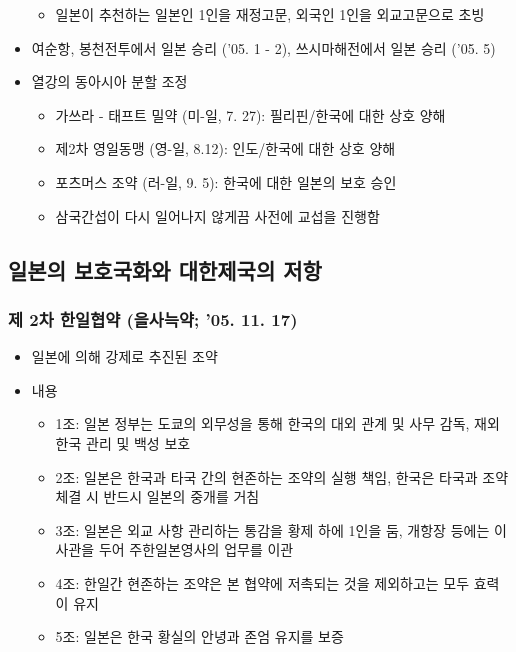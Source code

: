 \begin{itemize}
    \begin{itemize}
        \item 일본이 추천하는 일본인 1인을 재정고문, 외국인 1인을 외교고문으로 초빙
    \end{itemize}
    \item 여순항, 봉천전투에서 일본 승리 ('05. 1 - 2), 쓰시마해전에서 일본 승리 ('05. 5)
    \newpage
    \item 열강의 동아시아 분할 조정
    \begin{itemize}
        \item 가쓰라 - 태프트 밀약 (미-일, 7. 27): 필리핀/한국에 대한 상호 양해
        \item 제2차 영일동맹 (영-일, 8.12): 인도/한국에 대한 상호 양해
        \item 포츠머스 조약 (러-일, 9. 5): 한국에 대한 일본의 보호 승인
        \item 삼국간섭이 다시 일어나지 않게끔 사전에 교섭을 진행함
    \end{itemize}
\end{itemize}

\subsection{일본의 보호국화와 대한제국의 저항}

\subsubsection*{제 2차 한일협약 (을사늑약; '05. 11. 17)}

\begin{itemize}
    \item 일본에 의해 강제로 추진된 조약
    \item 내용
    \begin{itemize}
        \item 1조: 일본 정부는 도쿄의 외무성을 통해 한국의 대외 관계 및 사무 감독, 재외 한국 관리 및 백성 보호
        \item 2조: 일본은 한국과 타국 간의 현존하는 조약의 실행 책임, 한국은 타국과 조약 체결 시 반드시 일본의 중개를 거침
        \item 3조: 일본은 외교 사항 관리하는 통감을 황제 하에 1인을 둠, 개항장 등에는 이사관을 두어 주한일본영사의 업무를 이관
        \item 4조: 한일간 현존하는 조약은 본 협약에 저촉되는 것을 제외하고는 모두 효력이 유지
        \item 5조: 일본은 한국 황실의 안녕과 존엄 유지를 보증
    \end{itemize}
\end{itemize}

